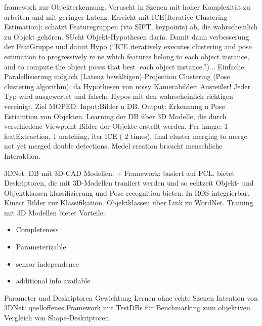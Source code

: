 \cite{moped} \newline
framework zur Objekterkennung. Veruscht in Szenen mit hoher Komplexität zu arbeiten und mit geringer Latenz. \newline
Erreicht mit ICE(Iterative Clustering-Estimation): schätzt Featuregruppen (via SIFT, keypoints) ab, die wahrscheinlich zu Objekt gehören. SUcht Objekt-Hypothesen darin. Damit dann verbesserung der FeatGruppe und damit Hypo (``ICE iteratively executes clustering and pose estimation to progressively rene which features belong to each object instance, and to compute the object poses that best each object instance.'')... Einfache Paralellisierung möglich (Latenz bewältigen) \newline
Projection Clustering (Pose clustering algorithm): da Hypothesen von noisy Kamerabilder: Ausreißer! Jeder Typ wird ausgewertet und falsche Hypos mit den wahrscheinlich richtigen vereinigt. \newline
Ziel MOPED: Input:Bilder u DB. Output: Erkennung u Pose Estiamtion von Objekten. \newline
Learning der DB über 3D Modelle, die durch verschiedene Viewpoint Bilder der Objekte erstellt werden. \newline
Per image: 1 featExtraction, 1 matching, iter ICE ( 2 times), final cluster merging to merge not yet merged double detections. \newline
Medel creation braucht menschliche Interaktion. \par


\cite{3dnet} \newline
3DNet: DB mit 3D-CAD Modellen. + Framework: basiert auf PCL. bietet Deskriptoren, die mit 3D-Modellen traniiert werden und so echtzeit Objekt- und Objektklassen klassifizierung und Pose recognition bieten. In ROS integrierbar. Kinect Bilder zur Klassifikation. \newline
Objektklassen über Link zu WordNet. \newline 
Training mit 3D Modellen bietet Vorteile: 
\begin{itemize}
	\item Completeness
	\item Parameterizable
	\item sensor independence
	\item additional info available
\end{itemize}
Parameter und Deskriptoren Gewichtung Lernen ohne echte Szenen \newline
Intention von 3DNet: quelloffenes Framework mit TestDBs für Benchmarking zum objektiven Vergleich von Shape-Deskriptoren. \par


